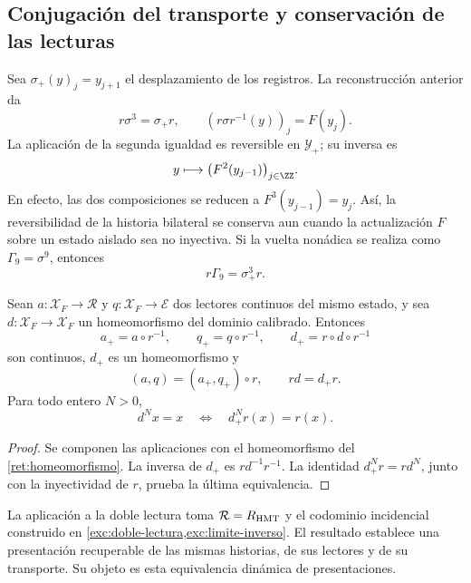 \subsection{Conjugación del transporte y conservación de las lecturas}

Sea \(\sigma_+(y)_j=y_{j+1}\) el desplazamiento de los registros.
La reconstrucción anterior da
\begin{equation}
 r\sigma^3=\sigma_+r,\qquad
 (r\sigma r^{-1}(y))_j=F(y_j).
 \label{ret:conjugacion}
\end{equation}
La aplicación de la segunda igualdad es reversible en
\(\mathscr Y_+\); su inversa es
\[
 y\longmapsto\bigl(F^2(y_{j-1})\bigr)_{j\in\ZZ}.
\]
En efecto, las dos composiciones se reducen a
\(F^3(y_{j-1})=y_j\).
Así, la reversibilidad de la historia bilateral se conserva aun
cuando la actualización \(F\) sobre un estado aislado sea no inyectiva.
Si la vuelta nonádica se realiza como \(\Gamma_9=\sigma^9\), entonces
\begin{equation}
 r\Gamma_9=\sigma_+^3r.
 \label{ret:vuelta-nonadica}
\end{equation}

\begin{corollary}
\label{ret:lecturas}
Sean \(a:\mathscr X_F\to\mathcal R\) y
\(q:\mathscr X_F\to\mathcal E\) dos lectores continuos del mismo
estado, y sea \(d:\mathscr X_F\to\mathscr X_F\) un homeomorfismo del
dominio calibrado. Entonces
\[
 a_+=a\circ r^{-1},\qquad
 q_+=q\circ r^{-1},\qquad
 d_+=r\circ d\circ r^{-1}
\]
son continuos, \(d_+\) es un homeomorfismo y
\begin{equation}
 (a,q)=(a_+,q_+)\circ r,\qquad rd=d_+r.
 \label{ret:factorizacion}
\end{equation}
Para todo entero \(N>0\),
\[
 d^Nx=x\quad\Longleftrightarrow\quad d_+^Nr(x)=r(x).
\]
\end{corollary}
\begin{proof}
Se componen las aplicaciones con el homeomorfismo del
\cref{ret:homeomorfismo}. La inversa de \(d_+\) es
\(rd^{-1}r^{-1}\). La identidad
\(d_+^Nr=rd^N\), junto con la inyectividad de \(r\), prueba la
última equivalencia.
\end{proof}

La aplicación a la doble lectura toma
\(\mathcal R=R_{\rm HMT}\) y el codominio incidencial construido en
\cref{exc:doble-lectura,exc:limite-inverso}.
El resultado establece una presentación recuperable de las mismas
historias, de sus lectores y de su transporte. Su objeto es esta
equivalencia dinámica de presentaciones.


